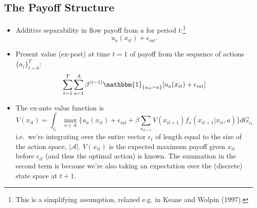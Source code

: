 \documentclass[11pt]{article}
\begin{document}
\subsection*{The Payoff Structure}
	\begin{itemize}
		\item Additive separability in flow payoff from $a$ for period $t$:\footnote{This is a simplifying assumption, relaxed e.g. in Keane and Wolpin (1997).}
		\begin{equation}
		u_a(x_{it}) + \epsilon_{iat}.
		\end{equation}
		\item Present value (ex-post) at time $t=1$ of payoff from the sequence of actions $\{a_{i}\}_{t=0}^T$:
		\begin{equation}
		\sum_{t=1}^{T}\sum_{a=1}^{A}\beta^{(t-1)} \mathbbm{1}_{\{a_{it}=a\}}[u_a(x_{it}) + \epsilon_{iat}]
		\end{equation}
		\item The ex-ante value function is
		\begin{equation}
		V(x_{it})=\int_{\epsilon_{t}}\max_{a\in A}\{u_a(x_{it}) + \epsilon_{iat} + \beta{}\sum_{x_{it+1}}V(x_{it+1})f_x(x_{it+1}|x_{it},a) \}dG_{\epsilon_{t}}
		\end{equation}
		i.e.\ we're integrating over the entire vector $\epsilon_{t}$ of length equal to the size of the action space, $|\mathcal{A}|$. $V(x_{it})$ is the expected maximum payoff given $x_{it}$ before $\epsilon_{it}$ (and thus the optimal action) is known. The summation in the second term is because we're also taking an expectation over the (discrete) state space at $t+1$.
	\end{itemize}
\end{document}
